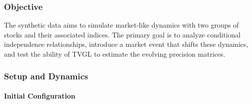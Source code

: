 \documentclass{article}
\begin{document}
\subsubsection{Objective}
The synthetic data aims to simulate market-like dynamics with two groups of stocks and their associated indices. The primary goal is to analyze conditional independence relationships, introduce a market event that shifts these dynamics, and test the ability of TVGL to estimate the evolving precision matrices.

\subsubsection{Setup and Dynamics}
\paragraph{Initial Configuration}
\end{document}
